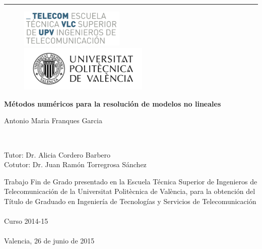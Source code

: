 
\thispagestyle{empty}
\rule{\linewidth}{2pt}

\begin{figure}[h]
	\begin{minipage}{.5\linewidth}
		\includegraphics[width=5cm,left]{logo_etsit.png}
	\end{minipage}
	\begin{minipage}{.5\linewidth}
		\hspace{1em}\includegraphics[width=6.2cm,right]{logo.png}
	\end{minipage}
\end{figure}

\vskip 70pt

\begin{center}
\textbf{\huge Métodos numéricos para la resolución de modelos no lineales } \\ \vskip 5pt
\end{center}

\vskip 70pt

\begin{center}
\begin{large} Antonio Maria Franques Garcia \end{large}\\
\end{center}

\vskip 50pt
\begin{center}
Tutor: Dr. Alicia Cordero Barbero \\
Cotutor: Dr. Juan Ram\'{o}n Torregrosa S\'{a}nchez
\end{center}

\vskip 100pt

\hfill
\begin{minipage}{.4\linewidth}
Trabajo Fin de Grado presentado en la Escuela Técnica Superior de Ingenieros de Telecomunicación de la Universitat Politècnica de València, para la obtención del Título de Graduado en Ingeniería de Tecnologías y Servicios de Telecomunicación\\\\
Curso 2014-15\\\\
Valencia, 26 de junio de 2015
\end{minipage}
\hspace{2em}
